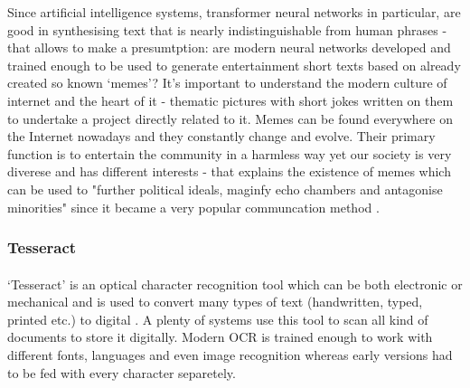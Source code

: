 \documentclass[12pt]{report}
\begin{document}
    Since artificial intelligence systems, transformer neural networks in particular, are good in synthesising text that is nearly indistinguishable from human phrases - that allows to make a presumtption: are modern neural networks developed and trained enough to be used to generate
    entertainment short texts based on already created so known `memes'? It's important to understand the modern culture of internet and the heart of it - thematic pictures with short jokes written on them to undertake a project directly related to it.
    Memes can be found everywhere on the Internet nowadays and they constantly change and evolve. Their primary function is to entertain the community in a harmless way yet our society is very diverese and has different interests - that explains the existence of memes which can be used
    to "further political ideals, maginfy echo chambers and antagonise minorities" since it became a very popular communcation method \citep{dank_learning}. 




    \subsubsection{Tesseract}
    \paragraph{}

    `Tesseract' is an optical character recognition tool which can be both electronic or mechanical and is used to convert many types of text (handwritten, typed, printed etc.) to digital \citep{tesseract_article}. A plenty of systems use this tool to scan all kind of documents to store it digitally.
    Modern OCR is trained enough to work with different fonts, languages and even image recognition whereas early versions had to be fed with every character separetely.
\end{document}
